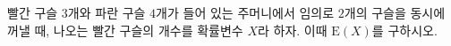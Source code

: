빨간 구슬 $3$개와 파란 구슬 $4$개가 들어 있는 주머니에서 임의로 $2$개의 구슬을 동시에 꺼낼 때, 나오는 빨간 구슬의 개수를 확률변수 $X$라 하자. 이때 $\mathrm{E}(X)$를 구하시오.
